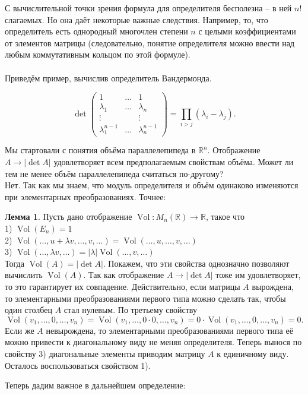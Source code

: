 \documentclass[10pt,a4paper,oneside]{book}
\theoremstyle{definition}
\newtheorem{lem}{Лемма}
\newcommand{\mb}[1]{\mathbb{#1}}
\newcommand{\Vol}{\operatorname{Vol}}
\def\exm{\noindent {\bf Примеры:}}
\def\lm{\begin{lem}}
\def\elm{\end{lem}}
\def\pmat{\begin{pmatrix}}
\def\epmat{\end{pmatrix}}
\begin{document}
С вычислительной точки зрения формула для определителя бесполезна -- в ней $n!$ слагаемых. Но она даёт некоторые важные следствия. Например, то, что определитель есть однородный многочлен степени $n$ с целыми коэффициентами от элементов матрицы (следовательно, понятие определителя можно ввести над любым коммутативным кольцом по этой формуле).\\


\exm\\
Приведём пример, вычислив определитель Вандермонда.

$$\det \pmat 1 & \dots & 1\\
\lambda_1 & \dots & \lambda_n\\
\vdots &&\vdots\\
\lambda_1^{n-1}& \dots & \lambda_n^{n-1} \epmat= \prod_{i>j}(\lambda_i-\lambda_j).$$


Мы стартовали с понятия объёма параллелепипеда в $\mb R^n$. Отображение $A \to |\det A|$ удовлетворяет всем предполагаемым свойствам объёма. Может ли тем не менее объём параллелепипеда считаться по-другому? \\
Нет. Так как мы знаем, что модуль определителя и объём одинаково изменяются при элементарных преобразованиях. Точнее:

\lm Пусть дано отображение $\Vol \colon M_n(\mb R) \to \mb R $, такое что \\
1) $\Vol(E_n)=1$\\
2) $\Vol(\dots,u+\lambda v,\dots,v,\dots)=\Vol(\dots,u,\dots,v,\dots)$\\
3) $\Vol(\dots,\lambda v,\dots)=|\lambda|\Vol(\dots,v,\dots)$\\
Тогда $\Vol(A)=|\det A|$.
\proof Покажем, что эти свойства однозначно позволяют вычислить $\Vol(A)$. Так как отображение $A\to |\det A|$ тоже им удовлетворяет, то это гарантирует их совпадение.  Действительно, если матрицы $A$ вырождена, то элементарными преобразованиями первого типа можно сделать так, чтобы один столбец $A$ стал нулевым. По третьему свойству $$\Vol(v_1,\dots,0,\dots,v_n)=\Vol(v_1,\dots,0\cdot 0,\dots,v_n)=0\cdot\Vol(v_1,\dots,0,\dots,v_n)=0.$$
Если же $A$ невырождена, то элементарными преобразованиями первого типа её можно привести к диагональному виду не меняя определителя. Теперь вынося по свойству 3) диагональные элементы приводим матрицу $A$ к единичному виду. Осталось воспользоваться свойством 1).
\endproof
\elm




Теперь дадим важное в дальнейшем определение:
\end{document}
